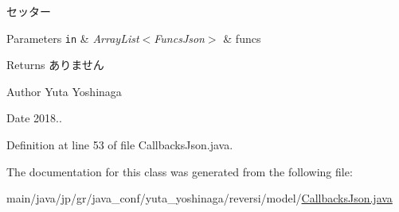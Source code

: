 セッター 


\begin{DoxyParams}[1]{Parameters}
\mbox{\tt in}  & {\em Array\+List$<$\+Funcs\+Json$>$} & funcs \\
\hline
\end{DoxyParams}
\begin{DoxyReturn}{Returns}
ありません 
\end{DoxyReturn}
\begin{DoxyAuthor}{Author}
Yuta Yoshinaga 
\end{DoxyAuthor}
\begin{DoxyDate}{Date}
2018.. 
\end{DoxyDate}


Definition at line 53 of file Callbacks\+Json.\+java.



The documentation for this class was generated from the following file\+:\begin{DoxyCompactItemize}
\item 
main/java/jp/gr/java\+\_\+conf/yuta\+\_\+yoshinaga/reversi/model/\hyperlink{_callbacks_json_8java}{Callbacks\+Json.\+java}\end{DoxyCompactItemize}
